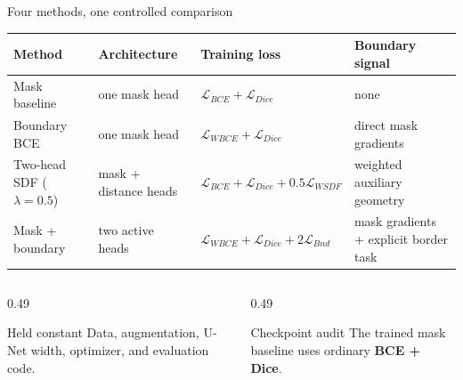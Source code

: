 \documentclass[aspectratio=169,10pt]{beamer}
\begin{document}
\begin{frame}{Four methods, one controlled comparison}
  \small
  \setlength{\tabcolsep}{4pt}
  \renewcommand{\arraystretch}{1.22}
  \begin{tabularx}{\textwidth}{@{}
    >{\raggedright\arraybackslash}p{}
    >{\raggedright\arraybackslash}p{}
    >{\raggedright\arraybackslash}p{}
    >{\raggedright\arraybackslash}X@{}}
    \toprule
    \textbf{Method} & \textbf{Architecture} & \textbf{Training loss} & \textbf{Boundary signal} \\
    \midrule
    Mask baseline &
    one mask head &
    $\mathcal{L}_{BCE}+\mathcal{L}_{Dice}$ &
    none \\
    \addlinespace
    Boundary BCE &
    one mask head &
    $\mathcal{L}_{WBCE}+\mathcal{L}_{Dice}$ &
    direct mask gradients \\
    \addlinespace
    Two-head SDF ($\lambda=0.5$) &
    mask + distance heads &
    $\mathcal{L}_{BCE}+\mathcal{L}_{Dice}+0.5\mathcal{L}_{WSDF}$ &
    weighted auxiliary geometry \\
    \addlinespace
    Mask + boundary &
    two active heads &
    $\mathcal{L}_{WBCE}+\mathcal{L}_{Dice}+2\mathcal{L}_{Bnd}$ &
    mask gradients + explicit border task \\
    \bottomrule
  \end{tabularx}

  \vspace{0.5em}
  \begin{columns}[T,onlytextwidth]
    \begin{column}{0.49\textwidth}
      \begin{block}{Held constant}
        Data, augmentation, U-Net width, optimizer, and evaluation code.
      \end{block}
    \end{column}
    \begin{column}{0.49\textwidth}
      \begin{block}{Checkpoint audit}
        The trained mask baseline uses ordinary \textbf{BCE + Dice}.
      \end{block}
    \end{column}
  \end{columns}
\end{frame}
\end{document}
